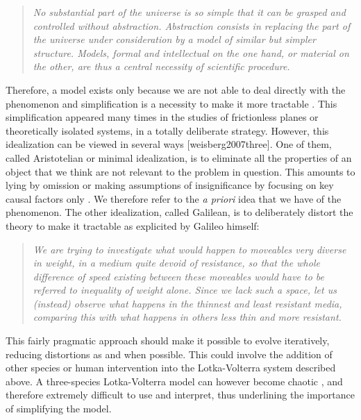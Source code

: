 \documentclass[a4paper,12pt,twoside,onecolumn,openright,final,oldfontcommands]{memoir}
\begin{document}
\begin{quote}
\emph{No substantial part of the universe is so simple that it can be
grasped and controlled without abstraction. Abstraction consists in
replacing the part of the universe under consideration by a model of
similar but simpler structure. Models, formal and intellectual on the
one hand, or material on the other, are thus a central necessity of
scientific procedure.}\\
\citep{rosenblueth1945role}
\end{quote}

Therefore, a model exists only because we are not able to deal directly
with the phenomenon and simplification is a necessity to make it more
tractable \citep{potochnik2017idealization}. This simplification
appeared many times in the studies of frictionless planes or
theoretically isolated systems, in a totally deliberate strategy.
However, this idealization can be viewed in several ways
{[}weisberg2007three{]}. One of them, called Aristotelian or minimal
idealization, is to eliminate all the properties of an object that we
think are not relevant to the problem in question. This amounts to lying
by omission or making assumptions of insignificance by focusing on key
causal factors only \citep{frigg2020models}. We therefore refer to the
\emph{a priori} idea that we have of the phenomenon. The other
idealization, called Galilean, is to deliberately distort the theory to
make it tractable as explicited by Galileo himself:

\begin{quote}
\emph{We are trying to investigate what would happen to moveables very
diverse in weight, in a medium quite devoid of resistance, so that the
whole difference of speed existing between these moveables would have to
be referred to inequality of weight alone. Since we lack such a space,
let us (instead) observe what happens in the thinnest and least
resistant media, comparing this with what happens in others less thin
and more resistant.}
\end{quote}

This fairly pragmatic approach should make it possible to evolve
iteratively, reducing distortions as and when possible. This could
involve the addition of other species or human intervention into the
Lotka-Volterra system described above. A three-species Lotka-Volterra
model can however become chaotic \citep{flake1998computational}, and
therefore extremely difficult to use and interpret, thus underlining the
importance of simplifying the model.
\end{document}
